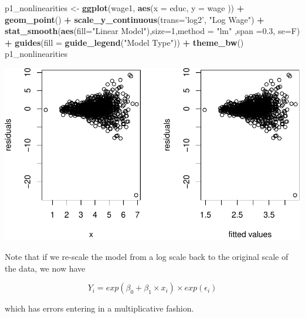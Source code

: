\documentclass[]{book}
\newenvironment{Shaded}{\begin{snugshade}}{\end{snugshade}}
\newcommand{\DataTypeTok}[1]{\textcolor[rgb]{0.13,0.29,0.53}{#1}}
\newcommand{\DecValTok}[1]{\textcolor[rgb]{0.00,0.00,0.81}{#1}}
\newcommand{\FloatTok}[1]{\textcolor[rgb]{0.00,0.00,0.81}{#1}}
\newcommand{\KeywordTok}[1]{\textcolor[rgb]{0.13,0.29,0.53}{\textbf{#1}}}
\newcommand{\NormalTok}[1]{#1}
\newcommand{\OperatorTok}[1]{\textcolor[rgb]{0.81,0.36,0.00}{\textbf{#1}}}
\newcommand{\StringTok}[1]{\textcolor[rgb]{0.31,0.60,0.02}{#1}}
\begin{document}
\begin{Shaded}
\begin{Highlighting}[]
\NormalTok{p1_nonlinearities <-}\StringTok{ }\KeywordTok{ggplot}\NormalTok{(wage1, }\KeywordTok{aes}\NormalTok{(}\DataTypeTok{x =}\NormalTok{ educ, }\DataTypeTok{y =}\NormalTok{ wage )) }\OperatorTok{+}
\StringTok{  }\KeywordTok{geom_point}\NormalTok{()   }\OperatorTok{+}\StringTok{ }
\StringTok{  }\KeywordTok{scale_y_continuous}\NormalTok{(}\DataTypeTok{trans=}\StringTok{'log2'}\NormalTok{, }\StringTok{"Log Wage"}\NormalTok{) }\OperatorTok{+}\StringTok{ }
\StringTok{  }\KeywordTok{stat_smooth}\NormalTok{(}\KeywordTok{aes}\NormalTok{(}\DataTypeTok{fill=}\StringTok{"Linear Model"}\NormalTok{),}\DataTypeTok{size=}\DecValTok{1}\NormalTok{,}\DataTypeTok{method =} \StringTok{"lm"}\NormalTok{ ,}\DataTypeTok{span =}\FloatTok{0.3}\NormalTok{, }\DataTypeTok{se=}\NormalTok{F) }\OperatorTok{+}\StringTok{ }
\StringTok{  }\KeywordTok{guides}\NormalTok{(}\DataTypeTok{fill =} \KeywordTok{guide_legend}\NormalTok{(}\StringTok{"Model Type"}\NormalTok{)) }\OperatorTok{+}\StringTok{ }
\StringTok{  }\KeywordTok{theme_bw}\NormalTok{()}
\NormalTok{p1_nonlinearities}
\end{Highlighting}
\end{Shaded}

\includegraphics{MEM5220_R_files/figure-latex/unnamed-chunk-55-1.pdf}

Note that if we re-scale the model from a log scale back to the original scale of the data, we now have

\begin{equation}
Y_{i} = exp(\beta_{0} + \beta_{1} \times x_{i})  \times exp(\epsilon_{i})
\end{equation}

which has errors entering in a multiplicative fashion.
\end{document}
